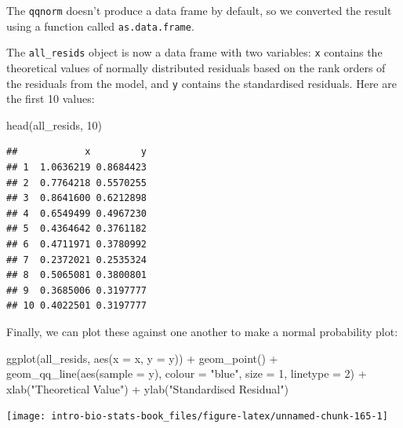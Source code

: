 \documentclass[
]{book}
\newenvironment{Shaded}{\begin{snugshade}}{\end{snugshade}}
\newcommand{\AttributeTok}[1]{\textcolor[rgb]{0.77,0.63,0.00}{#1}}
\newcommand{\DecValTok}[1]{\textcolor[rgb]{0.00,0.00,0.81}{#1}}
\newcommand{\FunctionTok}[1]{\textcolor[rgb]{0.00,0.00,0.00}{#1}}
\newcommand{\NormalTok}[1]{#1}
\newcommand{\SpecialCharTok}[1]{\textcolor[rgb]{0.00,0.00,0.00}{#1}}
\newcommand{\StringTok}[1]{\textcolor[rgb]{0.31,0.60,0.02}{#1}}
\begin{document}
The \texttt{qqnorm} doesn't produce a data frame by default, so we converted the result using a function called \texttt{as.data.frame}.

The \texttt{all\_resids} object is now a data frame with two variables: \texttt{x} contains the theoretical values of normally distributed residuals based on the rank orders of the residuals from the model, and \texttt{y} contains the standardised residuals. Here are the first 10 values:

\begin{Shaded}
\begin{Highlighting}[]
\FunctionTok{head}\NormalTok{(all\_resids, }\DecValTok{10}\NormalTok{)}
\end{Highlighting}
\end{Shaded}

\begin{verbatim}
##            x         y
## 1  1.0636219 0.8684423
## 2  0.7764218 0.5570255
## 3  0.8641600 0.6212898
## 4  0.6549499 0.4967230
## 5  0.4364642 0.3761182
## 6  0.4711971 0.3780992
## 7  0.2372021 0.2535324
## 8  0.5065081 0.3800801
## 9  0.3685006 0.3197777
## 10 0.4022501 0.3197777
\end{verbatim}

Finally, we can plot these against one another to make a normal probability plot:

\begin{Shaded}
\begin{Highlighting}[]
\FunctionTok{ggplot}\NormalTok{(all\_resids, }\FunctionTok{aes}\NormalTok{(}\AttributeTok{x =}\NormalTok{ x, }\AttributeTok{y =}\NormalTok{ y)) }\SpecialCharTok{+} 
  \FunctionTok{geom\_point}\NormalTok{() }\SpecialCharTok{+} 
  \FunctionTok{geom\_qq\_line}\NormalTok{(}\FunctionTok{aes}\NormalTok{(}\AttributeTok{sample =}\NormalTok{ y), }\AttributeTok{colour =} \StringTok{"blue"}\NormalTok{, }\AttributeTok{size =} \DecValTok{1}\NormalTok{, }\AttributeTok{linetype =} \DecValTok{2}\NormalTok{) }\SpecialCharTok{+}
  \FunctionTok{xlab}\NormalTok{(}\StringTok{"Theoretical Value"}\NormalTok{) }\SpecialCharTok{+} \FunctionTok{ylab}\NormalTok{(}\StringTok{"Standardised Residual"}\NormalTok{)}
\end{Highlighting}
\end{Shaded}

\begin{center}\texttt{[image: intro-bio-stats-book\_files/figure-latex/unnamed-chunk-165-1]} \end{center}
\end{document}
